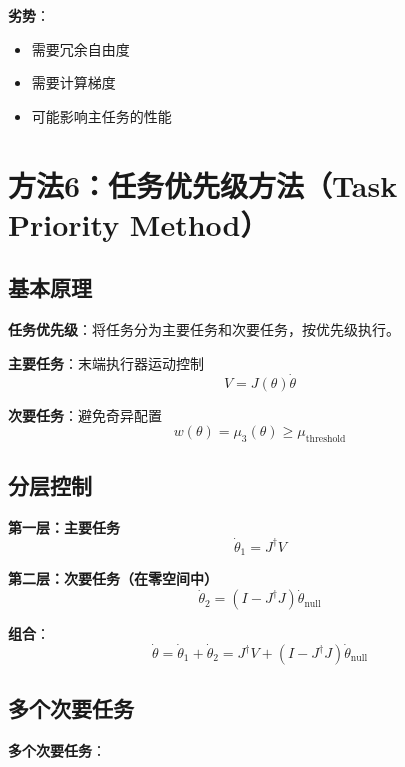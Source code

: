\documentclass[12pt,a4paper]{article}
\begin{document}
\textbf{劣势}：
\begin{itemize}
\item 需要冗余自由度
\item 需要计算梯度
\item 可能影响主任务的性能
\end{itemize}

\section{方法6：任务优先级方法（Task Priority Method）}

\subsection{基本原理}

\textbf{任务优先级}：将任务分为主要任务和次要任务，按优先级执行。

\textbf{主要任务}：末端执行器运动控制
\begin{equation}
V = J(\theta)\dot{\theta}
\end{equation}

\textbf{次要任务}：避免奇异配置
\begin{equation}
w(\theta) = \mu_3(\theta) \geq \mu_{\text{threshold}}
\end{equation}

\subsection{分层控制}

\textbf{第一层：主要任务}
\begin{equation}
\dot{\theta}_1 = J^{\dagger}V
\end{equation}

\textbf{第二层：次要任务（在零空间中）}
\begin{equation}
\dot{\theta}_2 = (I - J^{\dagger}J)\dot{\theta}_{\text{null}}
\end{equation}

\textbf{组合}：
\begin{equation}
\dot{\theta} = \dot{\theta}_1 + \dot{\theta}_2 = J^{\dagger}V + (I - J^{\dagger}J)\dot{\theta}_{\text{null}}
\end{equation}

\subsection{多个次要任务}

\textbf{多个次要任务}：
\end{document}
